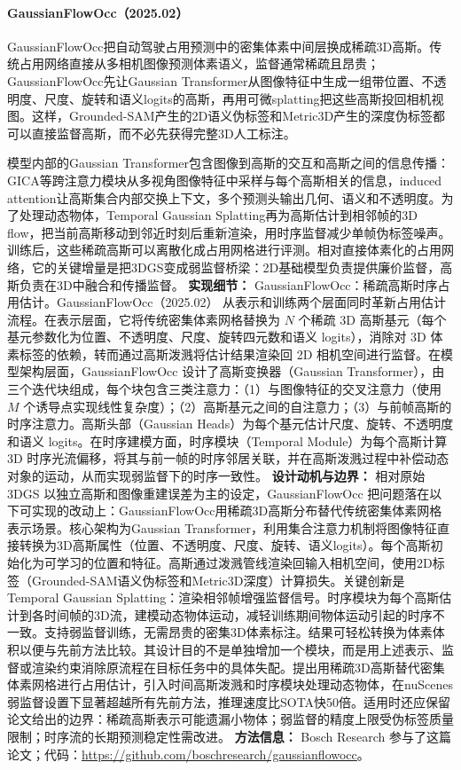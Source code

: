 \paragraph{GaussianFlowOcc（2025.02）\cite{2502_17288}}
GaussianFlowOcc把自动驾驶占用预测中的密集体素中间层换成稀疏3D高斯。传统占用网络直接从多相机图像预测体素语义，监督通常稀疏且昂贵；GaussianFlowOcc先让Gaussian Transformer从图像特征中生成一组带位置、不透明度、尺度、旋转和语义logits的高斯，再用可微splatting把这些高斯投回相机视图。这样，Grounded-SAM产生的2D语义伪标签和Metric3D产生的深度伪标签都可以直接监督高斯，而不必先获得完整3D人工标注。

模型内部的Gaussian Transformer包含图像到高斯的交互和高斯之间的信息传播：GICA等跨注意力模块从多视角图像特征中采样与每个高斯相关的信息，induced attention让高斯集合内部交换上下文，多个预测头输出几何、语义和不透明度。为了处理动态物体，Temporal Gaussian Splatting再为高斯估计到相邻帧的3D flow，把当前高斯移动到邻近时刻后重新渲染，用时序监督减少单帧伪标签噪声。训练后，这些稀疏高斯可以离散化成占用网格进行评测。相对直接体素化的占用网络，它的关键增量是把3DGS变成弱监督桥梁：2D基础模型负责提供廉价监督，高斯负责在3D中融合和传播监督。
\textbf{实现细节：} GaussianFlowOcc：稀疏高斯时序占用估计。GaussianFlowOcc（2025.02） 从表示和训练两个层面同时革新占用估计流程。在表示层面，它将传统密集体素网格替换为 $N$ 个稀疏 3D 高斯基元（每个基元参数化为位置、不透明度、尺度、旋转四元数和语义 logits），消除对 3D 体素标签的依赖，转而通过高斯泼溅将估计结果渲染回 2D 相机空间进行监督。在模型架构层面，GaussianFlowOcc 设计了高斯变换器（Gaussian Transformer），由三个迭代块组成，每个块包含三类注意力：（1）与图像特征的交叉注意力（使用 $M$ 个诱导点实现线性复杂度）；（2）高斯基元之间的自注意力；（3）与前帧高斯的时序注意力。高斯头部（Gaussian Heads）为每个基元估计尺度、旋转、不透明度和语义 logits。在时序建模方面，时序模块（Temporal Module）为每个高斯计算 3D 时序光流偏移，将其与前一帧的时序邻居关联，并在高斯泼溅过程中补偿动态对象的运动，从而实现弱监督下的时序一致性。 %
\textbf{设计动机与边界：} 相对原始 3DGS 以独立高斯和图像重建误差为主的设定，GaussianFlowOcc 把问题落在以下可实现的改动上：GaussianFlowOcc用稀疏3D高斯分布替代传统密集体素网格表示场景。核心架构为Gaussian Transformer，利用集合注意力机制将图像特征直接转换为3D高斯属性（位置、不透明度、尺度、旋转、语义logits）。每个高斯初始化为可学习的位置和特征。高斯通过泼溅管线渲染回输入相机空间，使用2D标签（Grounded-SAM语义伪标签和Metric3D深度）计算损失。关键创新是Temporal Gaussian Splatting：渲染相邻帧增强监督信号。时序模块为每个高斯估计到各时间帧的3D流，建模动态物体运动，减轻训练期间物体运动引起的时序不一致。支持弱监督训练，无需昂贵的密集3D体素标注。结果可轻松转换为体素体积以便与先前方法比较。其设计目的不是单独增加一个模块，而是用上述表示、监督或渲染约束消除原流程在目标任务中的具体失配。提出用稀疏3D高斯替代密集体素网格进行占用估计，引入时间高斯泼溅和时序模块处理动态物体，在nuScenes弱监督设置下显著超越所有先前方法，推理速度比SOTA快50倍。适用时还应保留论文给出的边界：稀疏高斯表示可能遗漏小物体；弱监督的精度上限受伪标签质量限制；时序流的长期预测稳定性需改进。
\textbf{方法信息：} Bosch Research 参与了这篇论文；代码：\url{https://github.com/boschresearch/gaussianflowocc}。

